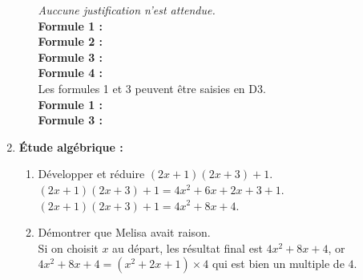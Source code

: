 \begin{corrige}
\begin{enumerate}
\begin{enumerate}
            \textit{Auccune justification n'est attendue.}\\            
            {\bfseries Formule 1 : } \\
            {\bfseries Formule 2 : } \\
            {\bfseries Formule 3 : } \\
            {\bfseries Formule 4 : } \\
            {\red Les formules 1 et 3 peuvent être saisies en D3.\\
            {\bfseries Formule 1 : } \\
            {\bfseries Formule 3 : } \\            
            }            
        \end{enumerate}
        \setcounter{enumi}{2}
        \item {\bfseries Étude algébrique : }\\
        \begin{enumerate}
            \item Développer et réduire $(2x+1)(2x+3)+1$.\\
            {\red $(2x+1)(2x+3)+1 = 4x^2+6x+2x+3+1$.\\
            $(2x+1)(2x+3)+1 = 4x^2+8x+4$.\\
            }
            \item Démontrer que Melisa avait raison.\\
            {\red Si on choisit $x$ au départ, les résultat final est $4x^2+8x+4$, or $4x^2+8x+4=(x^2+2x+1)\times 4$ qui est bien un multiple de $4$.}
            
        \end{enumerate}
    \end{enumerate}
\end{corrige}


